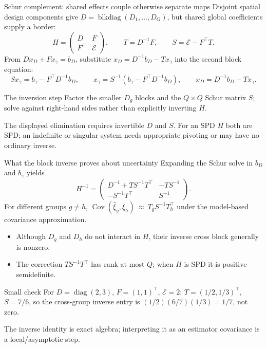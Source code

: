 \documentclass[aspectratio=169,10pt]{beamer}
\newcommand{\diag}{\operatorname{diag}}
\newcommand{\blkdiag}{\operatorname{blkdiag}}
\newcommand{\Cov}{\operatorname{Cov}}
\begin{document}
\begin{frame}{Schur complement: shared effects couple otherwise separate maps}
Disjoint spatial design components give $D=\blkdiag(D_1,\ldots,D_G)$,
but shared global coefficients supply a border:
\[
H=\begin{pmatrix}D&F\\F^\top&\mathcal E\end{pmatrix},
\qquad T=D^{-1}F,\qquad S=\mathcal E-F^\top T.
\]
From $Dx_D+Fx_\gamma=b_D$, substitute
$x_D=D^{-1}b_D-Tx_\gamma$ into the second block equation:
\[
Sx_\gamma=b_\gamma-F^\top D^{-1}b_D,
\qquad
x_\gamma=S^{-1}(b_\gamma-F^\top D^{-1}b_D),\qquad
x_D=D^{-1}b_D-Tx_\gamma.
\]
\begin{block}{The inversion step}
Factor the smaller $D_g$ blocks and the $Q\times Q$ Schur matrix $S$;
solve against right-hand sides rather than explicitly inverting $H$.
\end{block}
\small The displayed elimination requires invertible $D$ and $S$.
For an SPD $H$ both are SPD; an indefinite or singular system needs
appropriate pivoting or may have no ordinary inverse.
\end{frame}

\begin{frame}{What the block inverse proves about uncertainty}
Expanding the Schur solve in $b_D$ and $b_\gamma$ yields
\[
\boxed{H^{-1}=
\begin{pmatrix}
D^{-1}+TS^{-1}T^\top&-TS^{-1}\\
-S^{-1}T^\top&S^{-1}
\end{pmatrix}.}
\]
\small For different groups $g\ne h$,
$\Cov(\widehat\xi_g,\widehat\xi_h)\ \approx\
T_gS^{-1}T_h^\top$ under the model-based covariance approximation.
\begin{itemize}
  \item Although $D_g$ and $D_h$ do not interact in $H$, their inverse
        cross block generally is nonzero.
  \item The correction $TS^{-1}T^\top$ has rank at most $Q$; when $H$ is
        SPD it is positive semidefinite.
\end{itemize}
\begin{block}{Small check}
For $D=\diag(2,3)$, $F=(1,1)^\top$, $\mathcal E=2$:
$T=(1/2,1/3)^\top$, $S=7/6$, so the cross-group inverse entry is
$(1/2)(6/7)(1/3)=1/7$, not zero.
\end{block}
\small The inverse identity is exact algebra; interpreting it as an estimator
covariance is a local/asymptotic step.
\end{frame}
\end{document}
